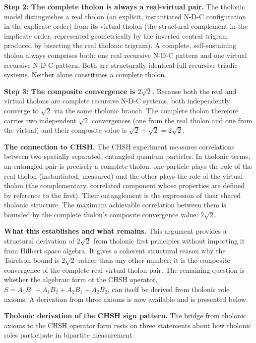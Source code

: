 \documentclass[
  11pt,
  letterpaper,
]{article}
\begin{document}
\textbf{Step 2: The complete tholon is always a real-virtual pair.} The
tholonic model distinguishes a real tholon (an explicit, instantiated
N-D-C configuration in the explicate order) from its virtual tholon (the
structural complement in the implicate order, represented geometrically
by the inverted central trigram produced by bisecting the real tholonic
trigram). A complete, self-sustaining tholon always comprises both: one
real recursive N-D-C pattern and one virtual recursive N-D-C pattern.
Both are structurally identical full recursive triadic systems. Neither
alone constitutes a complete tholon.

\textbf{Step 3: The composite convergence is \(2\sqrt{2}\).} Because
both the real and virtual tholons are complete recursive N-D-C systems,
both independently converge to \(\sqrt{2}\) via the same tholonic
branch. The complete tholon therefore carries two independent
\(\sqrt{2}\) convergences (one from the real tholon and one from the
virtual) and their composite value is
\(\sqrt{2} + \sqrt{2} = 2\sqrt{2}\).

\textbf{The connection to CHSH.} The CHSH experiment measures
correlations between two spatially separated, entangled quantum
particles. In tholonic terms, an entangled pair is precisely a complete
tholon: one particle plays the role of the real tholon (instantiated,
measured) and the other plays the role of the virtual tholon (the
complementary, correlated component whose properties are defined by
reference to the first). Their entanglement is the expression of their
shared tholonic structure. The maximum achievable correlation between
them is bounded by the complete tholon's composite convergence value:
\(2\sqrt{2}\).

\textbf{What this establishes and what remains.} This argument provides
a structural derivation of \(2\sqrt{2}\) from tholonic first principles
without importing it from Hilbert space algebra. It gives a coherent
structural reason why the Tsirelson bound is \(2\sqrt{2}\) rather than
any other number: it is the composite convergence of the complete
real-virtual tholon pair. The remaining question is whether the
algebraic form of the CHSH operator,
\(S = A_1B_1 + A_1B_2 + A_2B_1 - A_2B_2\), can itself be derived from
tholonic role axioms. A derivation from three axioms is now available
and is presented below.

\textbf{Tholonic derivation of the CHSH sign pattern.} The bridge from
tholonic axioms to the CHSH operator form rests on three statements
about how tholonic roles participate in bipartite measurement.
\end{document}
